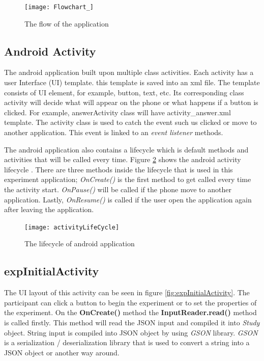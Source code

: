 \begin{figure}
\begin{center}
\texttt{[image: Flowchart\_]}
\end{center}
\centering
\captionsetup{justification=centering}
\caption{The flow of the application}
\label{fig:flowOfApplication}
\end{figure}

\subsection{Android Activity}
The android application built upon multiple class activities.
Each activity has a user Interface (UI) template. this template is saved into an xml file. The template consists of UI element, for example, button, text, etc.
Its corresponding class activity will decide what will appear on the phone or what happens if a button is clicked.
For example, answerActivity class will have activity\_answer.xml template.
The activity class is used to catch the event such us clicked or move to another application. This event is linked to an \textit{event listener} methods.

The android application also contains a lifecycle which is default methods and activities that will be called every time.
Figure \ref{fig:theLifeCycleOfActivity} shows the android activity lifecycle \citep{androidActivity}.
There are three methods inside the lifecycle that is used in this experiment application;
 \textit{OnCreate()} is the first method to get called every time the activity start.
 \textit{OnPause()} will be called if the phone move to another application.
 Lastly,  \textit{OnResume()} is called if the user open the application again after leaving the application.

\begin{figure}[!tbh]
\begin{center}
\texttt{[image: activityLifeCycle]}
\end{center}
\centering
\captionsetup{justification=centering}
\caption{The lifecycle of android application}
\label{fig:theLifeCycleOfActivity}
\end{figure}



\subsection{expInitialActivity}
The UI layout of this activity can be seen in figure \ref{fig:expInitialActivity}.
The participant can click a button to begin the experiment or to set the properties of the experiment.
On the \textbf{OnCreate()} method the \textbf{InputReader.read()} method is called firstly.
This method will read the JSON input and compiled it into \textit{Study} object.
String input is compiled into JSON object by using \textit{GSON} library.
\textit{GSON} is a serialization / deserialization library that is used to convert a string into a JSON object or another way around. \citep{gsonLib}

